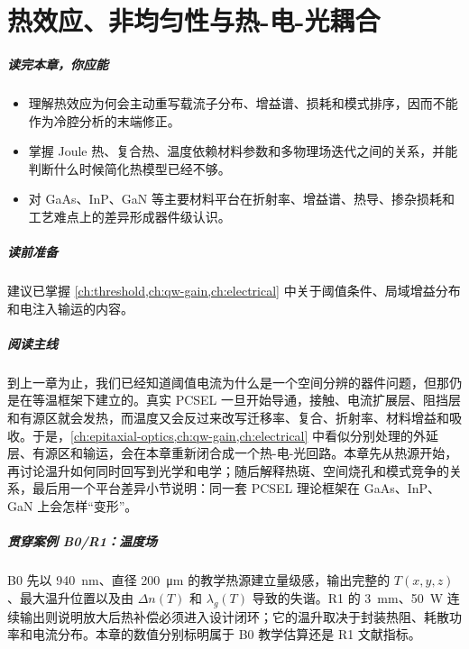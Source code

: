 ﻿%
\chapter{热效应、非均匀性与热-电-光耦合}
\label{ch:eto-coupling}

\paragraph{读完本章，你应能}
\begin{itemize}
  \item 理解热效应为何会主动重写载流子分布、增益谱、损耗和模式排序，因而不能作为冷腔分析的末端修正。
  \item 掌握 Joule 热、复合热、温度依赖材料参数和多物理场迭代之间的关系，并能判断什么时候简化热模型已经不够。
  \item 对 GaAs、InP、GaN 等主要材料平台在折射率、增益谱、热导、掺杂损耗和工艺难点上的差异形成器件级认识。
\end{itemize}

\paragraph{读前准备}
建议已掌握 \cref{ch:threshold,ch:qw-gain,ch:electrical} 中关于阈值条件、局域增益分布和电注入输运的内容。

\paragraph{阅读主线}
到上一章为止，我们已经知道阈值电流为什么是一个空间分辨的器件问题，但那仍是在等温框架下建立的。真实 PCSEL 一旦开始导通，接触、电流扩展层、阻挡层和有源区就会发热，而温度又会反过来改写迁移率、复合、折射率、材料增益和吸收。于是，\cref{ch:epitaxial-optics,ch:qw-gain,ch:electrical} 中看似分别处理的外延层、有源区和输运，会在本章重新闭合成一个热-电-光回路。本章先从热源开始，再讨论温升如何同时回写到光学和电学；随后解释热斑、空间烧孔和模式竞争的关系，最后用一个平台差异小节说明：同一套 PCSEL 理论框架在 GaAs、InP、GaN 上会怎样“变形”。

\paragraph{贯穿案例 B0/R1：温度场}
B0 先以 \SI{940}{nm}、直径 \SI{200}{\micro\meter} 的教学热源建立量级感，输出完整的 $T(x,y,z)$、最大温升位置以及由 $\Delta n(T)$ 和 $\lambda_g(T)$ 导致的失谐。R1 的 \SI{3}{mm}、\SI{50}{W} 连续输出则说明放大后热补偿必须进入设计闭环\cite{yoshida2023,noda2023tutorial}；它的温升取决于封装热阻、耗散功率和电流分布。本章的数值分别标明属于 B0 教学估算还是 R1 文献指标。

